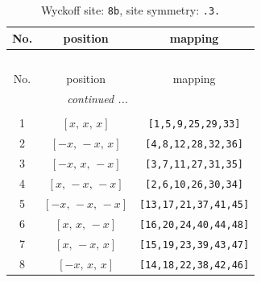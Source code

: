 \documentclass[fleqn,8pt]{jsarticle}
\begin{document}
\renewcommand{\arraystretch}{1.2}
\begin{longtable}{ccc}
\caption{Wyckoff site: {\tt 8b}, site symmetry: {\tt .3.}}
 \\
 \hline \hline
No. & position & mapping \\ \hline \endfirsthead

\multicolumn{2}{l}{\tablename\ \thetable{}} \\
 \hline \hline
No. & position & mapping \\ \hline \endhead

 \hline \hline
\multicolumn{2}{r}{\footnotesize\it continued ...} \\ \endfoot

 \hline \hline
\multicolumn{2}{r}{} \\ \endlastfoot

1 & $\left[ x,\, x,\, x \right]$ & {\tt [1,5,9,25,29,33]} \\ \hline
2 & $\left[ - x,\, - x,\, x \right]$ & {\tt [4,8,12,28,32,36]} \\ \hline
3 & $\left[ - x,\, x,\, - x \right]$ & {\tt [3,7,11,27,31,35]} \\ \hline
4 & $\left[ x,\, - x,\, - x \right]$ & {\tt [2,6,10,26,30,34]} \\ \hline
5 & $\left[ - x,\, - x,\, - x \right]$ & {\tt [13,17,21,37,41,45]} \\ \hline
6 & $\left[ x,\, x,\, - x \right]$ & {\tt [16,20,24,40,44,48]} \\ \hline
7 & $\left[ x,\, - x,\, x \right]$ & {\tt [15,19,23,39,43,47]} \\ \hline
8 & $\left[ - x,\, x,\, x \right]$ & {\tt [14,18,22,38,42,46]} \\
\end{longtable}
\renewcommand{\arraystretch}{1.2}
\end{document}
